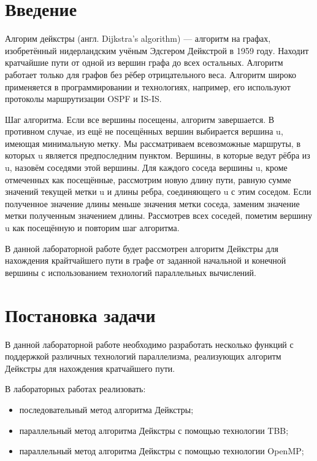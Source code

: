 \documentclass{report}
\begin{document}
\setcounter{page}{2}

\tableofcontents
\newpage

\section*{Введение}
Алгорим дейкстры (англ. Dijkstra’s algorithm) — алгоритм на графах, изобретённый нидерландским учёным Эдсгером Дейкстрой в 1959 году. Находит кратчайшие пути от одной из вершин графа до всех остальных. Алгоритм работает только для графов без рёбер отрицательного веса. Алгоритм широко применяется в программировании и технологиях, например, его используют протоколы маршрутизации OSPF и IS-IS.
\par Шаг алгоритма.
Если все вершины посещены, алгоритм завершается.
В противном случае, из ещё не посещённых вершин выбирается вершина u, имеющая минимальную метку.
Мы рассматриваем всевозможные маршруты, в которых u является предпоследним пунктом. Вершины, в которые ведут рёбра из u, назовём соседями этой вершины. Для каждого соседа вершины u, кроме отмеченных как посещённые, рассмотрим новую длину пути, равную сумме значений текущей метки u и длины ребра, соединяющего u с этим соседом.
Если полученное значение длины меньше значения метки соседа, заменим значение метки полученным значением длины. Рассмотрев всех соседей, пометим вершину u как посещённую и повторим шаг алгоритма.
\par В данной лабораторной работе будет рассмотрен алгоритм Дейкстры для нахождения крайтчайшего пути в графе от заданной начальной и конечной вершины с использованием технологий параллельных вычислений.
\newpage

\section*{Постановка задачи}
В данной лабораторной работе необходимо разработать несколько функций с поддержкой различных технологий параллелизма, реализующих алгоритм Дейкстры для нахождения кратчайшего пути.
\par В лабораторных работах реализовать:
\begin{itemize}
\item последовательный метод алгоритма Дейкстры;
\item параллельный метод алгоритма Дейкстры с помощью технологии TBB;
\item параллельный метод алгоритма Дейкстры с помощью технологии OpenMP;

\end{itemize}
\end{document}
